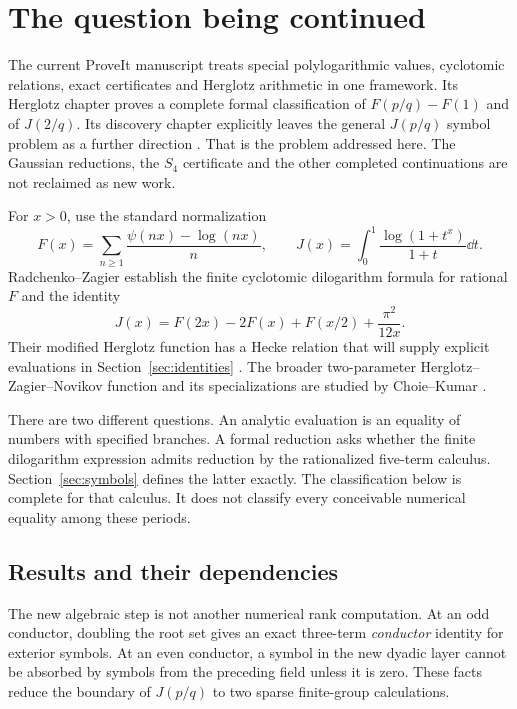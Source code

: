 \section{The question being continued}
\label{sec:context}

The current ProveIt manuscript treats special polylogarithmic values,
cyclotomic relations, exact certificates and Herglotz arithmetic in one
framework. Its Herglotz chapter proves a complete formal classification
of $F(p/q)-F(1)$ and of $J(2/q)$. Its discovery chapter explicitly leaves
the general $J(p/q)$ symbol problem as a further direction
\cite{Repo}. That is the problem addressed here. The Gaussian reductions,
the $S_4$ certificate and the other completed continuations are not
reclaimed as new work.

For $x>0$, use the standard normalization
\begin{equation}\label{eq:def-FJ}
 F(x)=\sum_{n\ge1}\frac{\psi(nx)-\log(nx)}{n},
 \qquad J(x)=\int_0^1\frac{\log(1+t^x)}{1+t}\dd t.
\end{equation}
Radchenko--Zagier establish the finite cyclotomic dilogarithm formula for
rational $F$ and the identity
\begin{equation}\label{eq:J-F}
 J(x)=F(2x)-2F(x)+F(x/2)+\frac{\pi^2}{12x}.
\end{equation}
Their modified Herglotz function has a Hecke relation that will supply
explicit evaluations in Section~\ref{sec:identities} \cite{RZ}.
The broader two-parameter Herglotz--Zagier--Novikov function and its
specializations are studied by Choie--Kumar \cite{CK}.

There are two different questions. An analytic evaluation is an equality
of numbers with specified branches. A formal reduction asks whether the
finite dilogarithm expression admits reduction by the rationalized
five-term calculus. Section~\ref{sec:symbols} defines the latter exactly.
The classification below is complete for that calculus. It does not
classify every conceivable numerical equality among these periods.

\subsection{Results and their dependencies}

The new algebraic step is not another numerical rank computation. At an
odd conductor, doubling the root set gives an exact three-term
\emph{conductor} identity for exterior symbols. At an even conductor,
a symbol in the new dyadic layer cannot be absorbed by symbols from
the preceding field unless it is zero. These facts reduce the boundary
of $J(p/q)$ to two sparse finite-group calculations.

